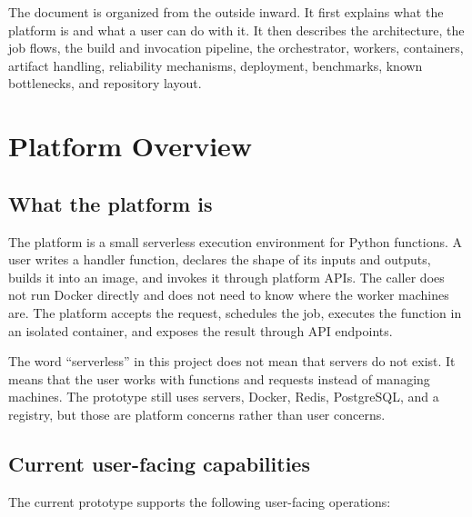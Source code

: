 \documentclass[12pt,a4paper]{report}
\begin{document}
The document is organized from the outside inward. It first explains what the
platform is and what a user can do with it. It then describes the architecture,
the job flows, the build and invocation pipeline, the orchestrator, workers,
containers, artifact handling, reliability mechanisms, deployment, benchmarks,
known bottlenecks, and repository layout.

\clearpage

\chapter{Platform Overview}

\section{What the platform is}

The platform is a small serverless execution environment for Python functions.
A user writes a handler function, declares the shape of its inputs and outputs,
builds it into an image, and invokes it through platform APIs. The caller does
not run Docker directly and does not need to know where the worker machines are.
The platform accepts the request, schedules the job, executes the function in
an isolated container, and exposes the result through API endpoints.

The word ``serverless'' in this project does not mean that servers do not
exist. It means that the user works with functions and requests instead of
managing machines. The prototype still uses servers, Docker, Redis, PostgreSQL,
and a registry, but those are platform concerns rather than user concerns.

\section{Current user-facing capabilities}

The current prototype supports the following user-facing operations:
\end{document}
